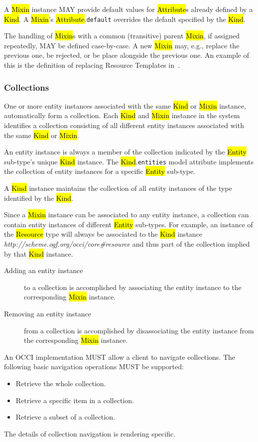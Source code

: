 \documentclass[10pt,a4paper]{article}
\begin{document}
A \hl{Mixin} instance MAY provide default values for \hl{Attribute}s already
defined by a \hl{Kind}. A \hl{Mixin}'s \hl{Attribute}.{\tt default} overrides
the default specified by the \hl{Kind}.

The handling of \hl{Mixin}s with a common (transitive) parent \hl{Mixin}, if assigned
repeatedly, MAY be defined case-by-case. A new \hl{Mixin} may, e.g., replace the previous
one, be rejected, or be place alongside the previous one. An example of this is the
definition of replacing Resource Templates in~\cite{occi:infrastructure}.


\subsubsection{Collections}
\label{sec:collection}
One or more entity instances associated with the same \hl{Kind} or
\hl{Mixin} instance, automatically form a collection.  Each \hl{Kind}
and \hl{Mixin} instance in the system identifies a collection
consisting of all different entity instances associated with the same
\hl{Kind} or \hl{Mixin}.

An entity instance is always a member of the collection indicated by
the \hl{Entity} sub-type's unique \hl{Kind} instance.
The \hl{Kind}.{\tt entities} model attribute implements the collection
of entity instances for a specific \hl{Entity} sub-type.

A \hl{Kind}
instance maintains the collection of all entity instances of the
type identified by the \hl{Kind}.

Since a \hl{Mixin} instance can be associated to any entity
instance, a collection can contain entity instances of different
\hl{Entity} sub-types.
For example, an instance of the \hl{Resource} type will always be
associated to the \hl{Kind} instance
\textit{http://scheme.ogf.org/occi/core\#resource} and thus part of
the collection implied by that \hl{Kind} instance.
%
\begin{description}
  \item[Adding an entity instance] to a collection is accomplished by
    associating the entity instance to the corresponding \hl{Mixin}
    instance.
  \item[Removing an entity instance] from a collection is
    accomplished by disassociating the entity instance from the
    corresponding \hl{Mixin} instance.
\end{description}
%
An OCCI implementation MUST allow a client to navigate
collections. The following basic navigation operations MUST be
supported:
%
\begin{itemize}
  \item Retrieve the whole collection.
  \item Retrieve a specific item in a collection.
  \item Retrieve a subset of a collection.
\end{itemize}
%
The details of collection navigation is rendering specific.
\end{document}
